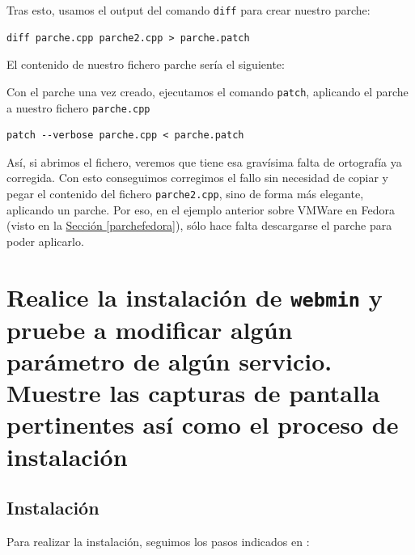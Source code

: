 \documentclass[10pt,a4paper,spanish]{article}
\numberwithin{equation}{section} %
\numberwithin{figure}{section} %
\numberwithin{table}{section} %
\begin{document}

Tras esto, usamos el output del comando \texttt{diff} para crear nuestro parche:
\begin{verbatim}
diff parche.cpp parche2.cpp > parche.patch
\end{verbatim}

El contenido de nuestro fichero parche sería el siguiente:

Con el parche una vez creado, ejecutamos el comando \texttt{patch}, aplicando el parche a nuestro fichero \texttt{parche.cpp}
\begin{verbatim}
patch --verbose parche.cpp < parche.patch
\end{verbatim}

Así, si abrimos el fichero, veremos que tiene esa gravísima falta de ortografía ya corregida. Con esto conseguimos corregimos el fallo sin necesidad de copiar y pegar el contenido del fichero \texttt{parche2.cpp}, sino de forma más elegante, aplicando un parche. Por eso, en el ejemplo anterior sobre VMWare en Fedora (visto en la \hyperref[parchefedora]{Sección \ref*{parchefedora}}), sólo hace falta descargarse el parche para poder aplicarlo.

\section{Realice la instalación de \texttt{webmin} y pruebe a modificar algún parámetro de algún servicio. Muestre las capturas de pantalla pertinentes así como el proceso de instalación}
\subsection{Instalación}
Para realizar la instalación, seguimos los pasos indicados en \cite{webmin}:
\end{document}
